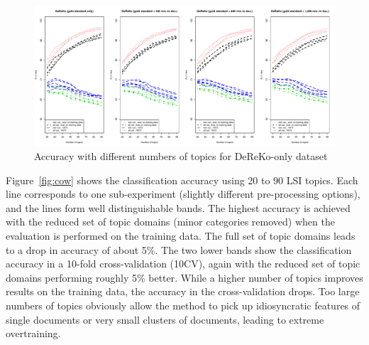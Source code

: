 \documentclass[11pt]{article}
\begin{document}
\begin{figure}[h]
  \centering
  \includegraphics[width=\textwidth]{graphics/dereko.pdf}
  \caption{Accuracy with different numbers of topics for DeReKo-only dataset}
  \label{fig:dereko}
\end{figure}

\begin{table}[h]
  \centering
  \caption{Evaluation at best achievable accuracy with the reduced set of topic domains in 10-fold cross-validation; Precision, Recall, and F-Measure are weighted averages across all categories}
  \label{tab:quality}
\end{table}

Figure~\ref{fig:cow} shows the classification accuracy using 20 to 90 LSI topics.
Each line corresponds to one sub-experiment (slightly different pre-processing options), and the lines form well distinguishable bands.
The highest accuracy is achieved with the reduced set of topic domains (minor categories removed) when the evaluation is performed on the training data.
The full set of topic domains leads to a drop in accuracy of about 5\%.
The two lower bands show the classification accuracy in a 10-fold cross-validation (10CV), again with the reduced set of topic domains performing roughly 5\% better.
While a higher number of topics improves results on the training data, the accuracy in the cross-validation drops.
Too large numbers of topics obviously allow the method to pick up idiosyncratic features of single documents or very small clusters of documents, leading to extreme overtraining.
\end{document}
